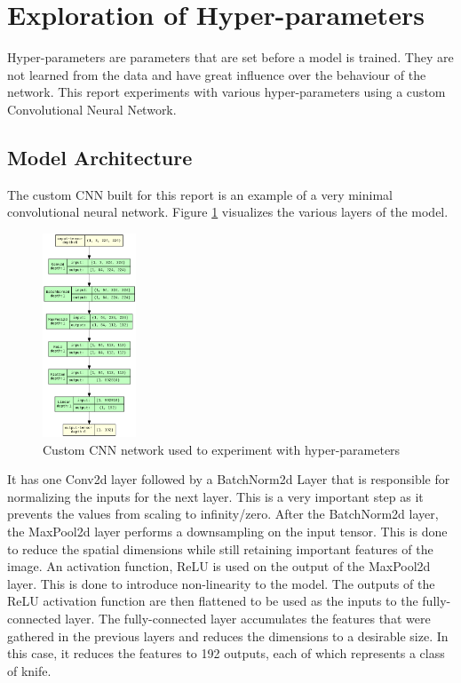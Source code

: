 \documentclass[10pt,twocolumn,letterpaper]{article}
\begin{document}
\section{Exploration of Hyper-parameters}
\label{sec:exp_hyper_params}

Hyper-parameters are parameters that are set before a model is trained. They are not learned from the data and have
great influence over the behaviour of the network. This report experiments with various hyper-parameters using a
custom Convolutional Neural Network.

\subsection{Model Architecture}

The custom CNN built for this report is an example of a very minimal convolutional neural network. Figure
\ref{fig:custom_cnn_chart} visualizes the various layers of the model.

\begin{figure}[htbp]
  \begin{center}
    \includegraphics[width=0.247\textwidth]{./assets/CustomCNN_visualization.png}
    \captionsetup{justification=centering}
    \caption{Custom CNN network used to experiment with hyper-parameters}
    \label{fig:custom_cnn_chart}
  \end{center}
\end{figure}

It has one Conv2d layer followed by a
BatchNorm2d Layer that is responsible for normalizing the inputs for the next layer. This is a very important step
as it prevents the values from scaling to infinity/zero. After the BatchNorm2d layer, the MaxPool2d layer performs a
downsampling on the input tensor. This is done to reduce the spatial dimensions while still retaining important
features of the image. An activation function, ReLU is used on the output of the MaxPool2d layer. This is done to
introduce non-linearity to the model. The outputs of the ReLU activation function are then flattened to be used as the
inputs to the fully-connected layer. The fully-connected layer accumulates the features that were gathered in the
previous layers and reduces the dimensions to a desirable size. In this case, it reduces the features to 192 outputs,
each of which represents a class of knife.
\end{document}
